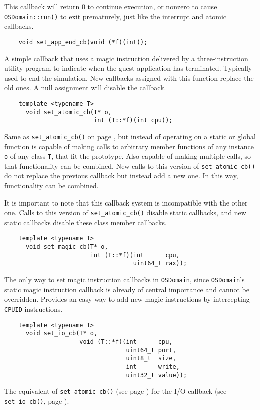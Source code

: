 \documentclass[letterpaper, 10pt]{book}
\begin{document}
This callback will return 0 to continue execution, or nonzero to cause
\texttt{OSDomain::run()} to exit prematurely, just like the interrupt and
atomic callbacks.

\label{func:set_app_end_cb} \begin{verbatim}
    void set_app_end_cb(void (*f)(int));
\end{verbatim}
A simple callback that uses a magic instruction delivered by a 
three-instruction utility program to indicate when the guest application has
terminated. Typically used to end the simulation. New callbacks
assigned with this function replace the old ones. A null assignment will
disable the callback.

\label{tf:set_atomic_cb} \begin{verbatim}
    template <typename T> 
      void set_atomic_cb(T* o, 
                         int (T::*f)(int cpu));
\end{verbatim}
Same as \texttt{set\_atomic\_cb()} on page \pageref{func:set_atomic_cb}, but
instead of operating on a static or global function is capable of making calls
to arbitrary member functions of any instance \texttt{o} of any class 
\texttt{T}, that fit the prototype. Also capable of making
multiple calls, so that functionality can be combined. New calls to this
version of \texttt{set\_atomic\_cb()} do not replace the previous callback but
instead add a new one. In this way, functionality can be combined.

It is important to note that this callback system is incompatible with the
other one. Calls to this version of \texttt{set\_atomic\_cb()} disable static
callbacks, and new static callbacks disable these class member callbacks.

\label{tf:set_magic_cb} \begin{verbatim}
    template <typename T>
      void set_magic_cb(T* o,
                        int (T::*f)(int      cpu, 
                                    uint64_t rax));
\end{verbatim}
The only way to set magic instruction callbacks in \texttt{OSDomain}, since
\texttt{OSDomain}'s static magic instruction callback is already of central
importance and cannot be overridden. Provides an easy way to add new magic
instructions by intercepting \texttt{CPUID} instructions.

\label{tf:set_io_cb} \begin{verbatim}
    template <typename T>
      void set_io_cb(T* o,
                     void (T::*f)(int      cpu, 
                                  uint64_t port,
                                  uint8_t  size, 
                                  int      write,
                                  uint32_t value));
\end{verbatim}
The equivalent of \texttt{set\_atomic\_cb()} (see page
\pageref{tf:set_atomic_cb}) for the I/O callback (see \texttt{set\_io\_cb()}, 
page \pageref{func:set_io_cb}).
\end{document}
